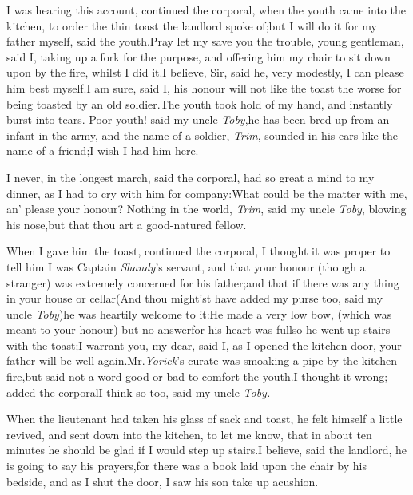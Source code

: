 \documentclass{article}
\begin{document}
I was hearing this account, continued the corporal, when the
youth came into the kitchen, to order the thin toast the landlord
spoke of;\tsh but I will do it for my father myself, said
the youth.\break\tsh Pray let my save you the trouble,
young gentleman, said I, taking up a fork for the purpose, and
offering him my chair to sit down upon by the fire, whilst I did
it.\tsh I believe, Sir, said he, very modestly, I can please him
best myself.\tsh I am sure, said I, his honour will not like the
toast the worse for being toasted by an old soldier.\tsh The
youth took hold of my hand, and instantly burst into tears.\tsh
Poor youth! said my uncle \textit{Toby},\tsk he has been bred up
from an infant in the army, and the name of a soldier,
\textit{Trim}, sounded in his ears like the name of a
friend;\tsk I wish I had him here.

\tsh I never, in the longest march, said the corporal,
had so great a mind to my dinner, as I had to cry with him for
company:\tsk What could be the matter with me, an’ please
your honour? Nothing in the world, \textit{Trim}, said my uncle
\textit{Toby}, blowing his nose,\tsk but that thou art a
good-natured fellow.

When I gave him the toast, continued the corporal, I thought it
was proper to tell him I was Captain \textit{Shandy}’s servant,
and that your honour (though a stranger) was extremely concerned
for his father;\tsk and that if there was any thing in your house
or cellar\tsh (And thou might’st have added my purse
too, said my uncle \textit{Toby})\tsh he was heartily
welcome to it:\tsh He made a very low bow, (which was meant
to your honour) but no answer\tsk for his heart was
full\tsk\break so he went up stairs with the toast;\tsk I warrant
you, my dear, said I, as I opened the kitchen-door, your father
will be well again.\tsh Mr.\@ \textit{Yorick}’s
curate was smoaking a pipe by the kitchen fire,\tsk but said not a
word good or bad to comfort the youth.\tsh I thought it
wrong; added the corporal\tsh I think so too, said my
uncle \textit{Toby.}

When the lieutenant had taken his glass of sack and toast, he
felt himself a little revived, and sent down into the kitchen, to
let me know, that in about\break
ten minutes he should be glad if I would
step up stairs.\tsh I believe, said the landlord, he is
going to say his prayers,\tsh for there was a book laid
upon the chair by his bedside, and as I shut the door, I saw his
son take up a\break cushion.\tsh
\end{document}
